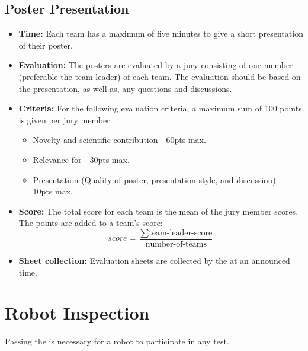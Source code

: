 \subsection*{Poster Presentation}
\label{sec:setupdays:posterpresentation}
\begin{itemize}
	\item \textbf{Time:} Each team has a maximum of five minutes to give a short presentation of their poster.
	\item \textbf{Evaluation:} The posters are evaluated by a jury consisting of one member (preferable the team leader) of each team. The evaluation should be based on the presentation, as well as, any questions and discussions.
	\item \textbf{Criteria:} For the following evaluation criteria, a maximum sum of 100 points is given per jury member:
	\begin{itemize}
		\item Novelty and scientific contribution - 60pts max.
		\item Relevance for \RoboCup\AtHome{} - 30pts max.
		\item Presentation (Quality of poster, presentation style, and discussion) - 10pts max.
	\end{itemize}
	\item \textbf{Score:} The total score for each team is the mean of the jury member scores. 
	The points are added to a team's \SONE{} score:
	$$
	score=\frac{\sum \text{team-leader-score}}{\text{number-of-teams}}
	$$
	\item \textbf{Sheet collection:} Evaluation sheets are collected by the \OC{} at an announced time.
\end{itemize}

\section{Robot Inspection}
\label{sec:setupdays:inspection}
Passing the \RobotInspection{} is necessary for a robot to participate in any test.

